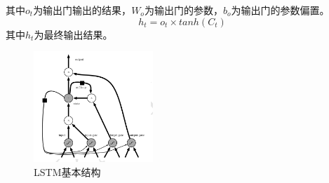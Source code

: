 其中$o_t$为输出门输出的结果，$W_o$为输出门的参数，$b_o$为输出门的参数偏置。
\begin{equation}
h_t = o_t \times tanh{(C_t)}
\end{equation}
其中$h_t$为最终输出结果。
\begin{figure}[!hbp]
\begin{center}
\includegraphics[width=0.4\textwidth]{graphic/lstm1.png}
\caption{LSTM基本结构\cite{deeplearning2016} \label{lstm1}}
\end{center}
\end{figure}